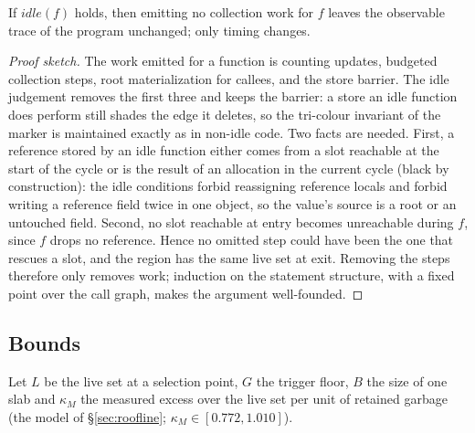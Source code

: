 \begin{theorem}
\label{thm:idle}
If $\mathit{idle}(f)$ holds, then emitting no collection work for $f$ leaves the observable trace of
the program unchanged; only timing changes.
\end{theorem}
\begin{proof}[Proof sketch]
The work emitted for a function is counting updates, budgeted collection steps, root materialization
for callees, and the store barrier.
The idle judgement removes the first three and keeps the barrier: a store an idle function does
perform still shades the edge it deletes, so the tri-colour invariant of the marker is maintained
exactly as in non-idle code.
Two facts are needed. First, a reference stored by an idle function either comes from a slot
reachable at the start of the cycle or is the result of an allocation in the current cycle (black by
construction): the idle conditions forbid reassigning reference locals and forbid writing a
reference field twice in one object, so the value's source is a root or an untouched field.
Second, no slot reachable at entry becomes unreachable during $f$, since $f$ drops no reference.
Hence no omitted step could have been the one that rescues a slot, and the region has the same live
set at exit.
Removing the steps therefore only removes work; induction on the statement structure, with a fixed
point over the call graph, makes the argument well-founded.
\end{proof}

\subsection{Bounds}
\label{sec:thm-bounds}

Let $L$ be the live set at a selection point, $G$ the trigger floor, $B$ the size of one slab and
$\kappa_M$ the measured excess over the live set per unit of retained garbage (the model of
\S\ref{sec:roofline}; $\kappa_M \in [0.772, 1.010]$).

